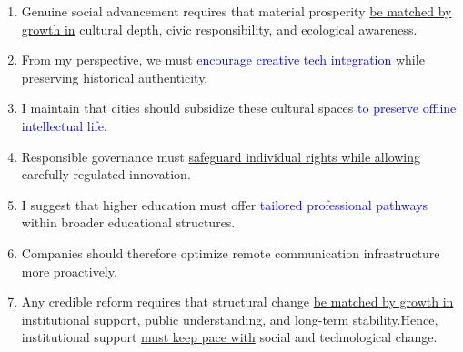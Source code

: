 \begin{enumerate}
    \item Genuine social advancement requires that material prosperity \underline{be matched by growth in} cultural depth, civic responsibility, and ecological awareness.

    \item From my perspective, we must \textcolor{blue}{encourage creative tech integration} while preserving historical authenticity. 

    \item I maintain that cities should subsidize these cultural spaces \textcolor{blue}{to preserve offline intellectual life}. 

    \item Responsible governance must \underline{safeguard individual rights while allowing} carefully regulated innovation.

    \item I suggest that higher education must offer \textcolor{blue}{tailored professional pathways} within broader educational structures. 

    \item Companies should therefore optimize remote communication infrastructure more proactively. 

    \item Any credible reform requires that structural change \underline{be matched by growth in} institutional support, public understanding, and long-term stability.Hence, institutional support \underline{must keep pace with} social and technological change.

  

\end{enumerate}


